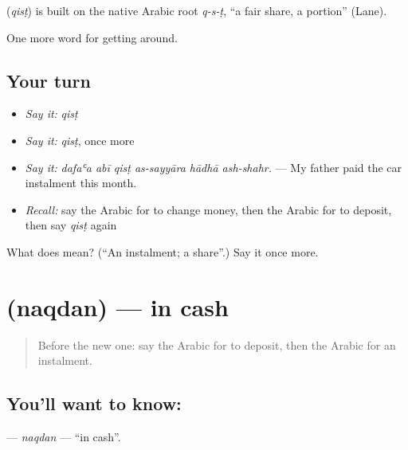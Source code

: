 \begin{cousinweb}
\textbf{} (\emph{qisṭ}) is built on the native Arabic root \emph{q-s-ṭ}, \textquotedblleft{}a fair share, a portion\textquotedblright{} (Lane).
\end{cousinweb}

\begin{grammarlens}[title={What you've built}]
One more word for getting around.
\end{grammarlens}

\subsection*{Your turn}
\begin{itemize}
\raggedright
  \item \emph{Say it:} \emph{qisṭ}
  \item \emph{Say it:} \emph{qisṭ}, once more
  \item \emph{Say it:} \emph{dafaʿa abī qisṭ as-sayyāra hādhā ash-shahr.} — My father paid the car instalment this month.
  \item \emph{Recall:} say the Arabic for to change money, then the Arabic for to deposit, then say \emph{qisṭ} again
\end{itemize}

\begin{tcolorbox}[breakable,colback=teal!4,colframe=teal!35!black,title={Before you move on}]
What does  mean? (\textquotedblleft{}An instalment; a share\textquotedblright{}.) Say it once more.
\end{tcolorbox}
\section[\texorpdfstring{\ar{نقدا} (naqdan)}{نقدا (naqdan)}]{ (naqdan) — in cash}

\label{lesson:AR-C453-naqdan}



\begin{quote}
Before the new one: say the Arabic for to deposit, then the Arabic for an instalment.
\end{quote}

\subsection*{You'll want to know: }
\textbf{} — \emph{naqdan} — \textquotedblleft{}in cash\textquotedblright{}.

